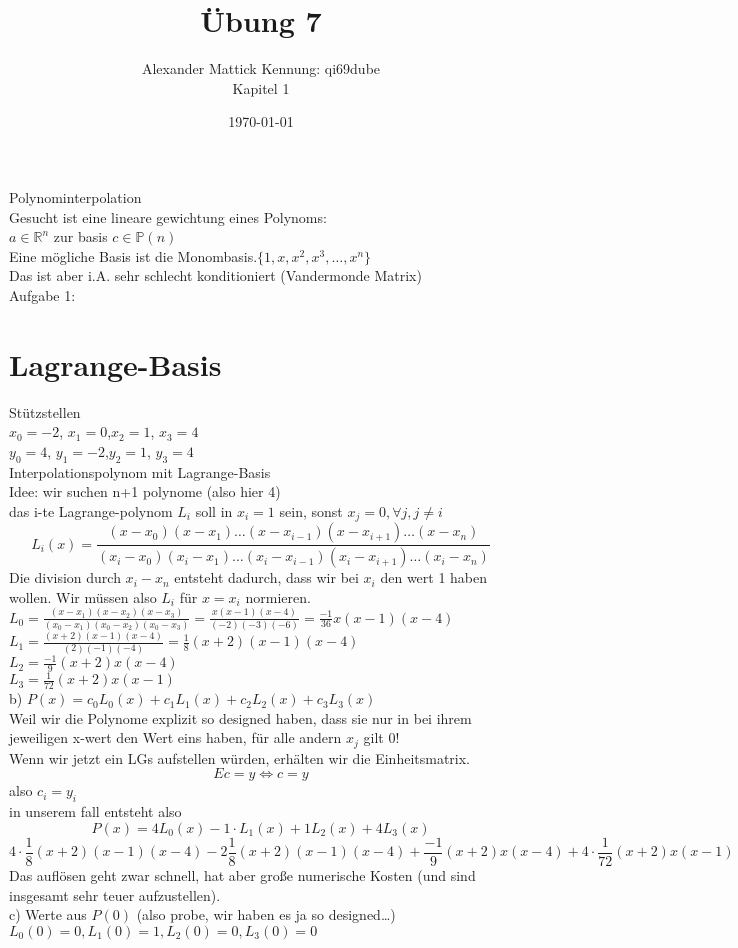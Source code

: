 \documentclass{article}
\author{
Alexander Mattick Kennung: qi69dube\\
Kapitel 1
}
\date{\today}
\title{Übung 7}
\begin{document}
	\maketitle

	Polynominterpolation\\
	Gesucht ist eine lineare gewichtung eines Polynoms:\\
	$a\in \mathbb{R}^n$ zur basis $c\in \mathbb{P}(n)$\\
	Eine mögliche Basis ist die Monombasis.$\{1,x,x^2,x^3,\dots,x^n\}$\\
	Das ist aber i.A. sehr schlecht konditioniert (Vandermonde Matrix)\\
	Aufgabe 1:\\
	\section{Lagrange-Basis}
	Stützstellen\\
	$x_0=-2$, $x_1=0$,$x_2=1$, $x_3=4$\\
	$y_0=4$, $y_1=-2$,$y_2=1$, $y_3=4$\\
	Interpolationspolynom mit Lagrange-Basis\\
	Idee: wir suchen n+1 polynome (also hier 4)\\
	das i-te Lagrange-polynom $L_i$ soll in $x_i=1$ sein, sonst $x_j=0,\forall j,j\neq i$\\
	\[L_i(x)=\frac{(x-x_0)(x-x_1)\dots (x-x_{i-1})(x-x_{i+1})\dots(x-x_n)}{(x_i-x_0)(x_i-x_1)\dots (x_i-x_{i-1})(x_i-x_{i+1})\dots(x_i-x_n)}\]
	Die division durch $x_i-x_n$ entsteht dadurch, dass wir bei $x_i$ den wert 1 haben wollen. Wir müssen also $L_i$ für $x=x_i$ normieren.\\
	$L_0 = \frac{(x-x_1)(x-x_2)(x-x_3)}{(x_0-x_1)(x_0-x_2)(x_0-x_3)} = \frac{x(x-1)(x-4)}{(-2)(-3)(-6)}=\frac{-1}{36}x(x-1)(x-4)$\\
	$L_1 = \frac{(x+2)(x-1)(x-4)}{(2)(-1)(-4)}=\frac{1}{8}(x+2)(x-1)(x-4)$\\
	$L_2 = \frac{-1}{9}(x+2)x(x-4)$\\
	$L_3 = \frac{1}{72}(x+2)x(x-1)$\\
	b) $P(x)=c_0L_0(x)+c_1L_1(x)+c_2L_2(x)+c_3L_3(x)$\\
	Weil wir die Polynome explizit so designed haben, dass sie nur in bei ihrem jeweiligen x-wert den Wert eins haben, für alle andern $x_j$ gilt 0!\\
	Wenn wir jetzt ein LGs aufstellen würden, erhälten wir die Einheitsmatrix.\\
	\[Ec=y\iff c=y\]
	also $c_i=y_i$\\
	in unserem fall entsteht also
	\[P(x)=4L_0(x)-1\cdot L_1(x)+1L_2(x)+4L_3(x)\]
	\[4\cdot \frac{1}{8}(x+2)(x-1)(x-4)-2\frac{1}{8}(x+2)(x-1)(x-4)+\frac{-1}{9}(x+2)x(x-4)+4\cdot \frac{1}{72}(x+2)x(x-1) \]
	Das auflösen geht zwar schnell, hat aber große numerische Kosten (und sind insgesamt sehr teuer aufzustellen).\\
	c) Werte aus $P(0)$ (also probe, wir haben es ja so designed\dots)\\
	$L_0(0)=0,L_1(0)=1,L_2(0)=0,L_3(0)=0$\\
\end{document}
